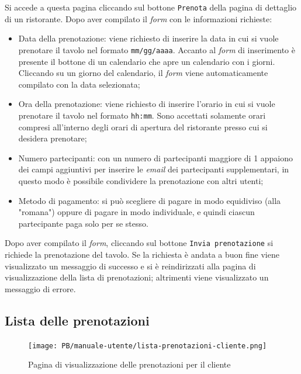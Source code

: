 Si accede a questa pagina cliccando sul bottone \texttt{Prenota} della pagina di
dettaglio di un ristorante. Dopo aver compilato il \textit{form} con le informazioni
richieste:
\begin{itemize}
	\item Data della prenotazione: viene richiesto di inserire la data in cui si
		vuole prenotare il tavolo nel formato \texttt{mm/gg/aaaa}. Accanto al
		\textit{form} di inserimento è presente il bottone di un calendario che apre un
		calendario con i giorni. Cliccando su un giorno del calendario, il \textit{form}
		viene automaticamente compilato con la data selezionata;

	\item Ora della prenotazione: viene richiesto di inserire l'orario in cui si
		vuole prenotare il tavolo nel formato \texttt{hh:mm}. Sono accettati
		solamente orari compresi all'interno degli orari di apertura del
		ristorante presso cui si desidera prenotare;

	\item Numero partecipanti: con un numero di partecipanti maggiore di 1
		appaiono dei campi aggiuntivi per inserire le \textit{email} dei partecipanti
		supplementari, in questo modo è possibile condividere la prenotazione
		con altri utenti;

	\item Metodo di pagamento: si può scegliere di pagare in modo equidiviso
		(alla "romana") oppure di pagare in modo individuale, e quindi ciascun
		partecipante paga solo per se stesso.
\end{itemize}

Dopo aver compilato il \textit{form}, cliccando sul bottone \texttt{Invia prenotazione} 
si richiede la prenotazione del tavolo. Se la richiesta è andata a buon fine
viene visualizzato un messaggio di successo e si è reindirizzati alla pagina di
visualizzazione della lista di prenotazioni; altrimenti viene visualizzato un
messaggio di errore.

\newpage
\subsection{Lista delle prenotazioni}
\begin{figure}[htbp]
    \centering
	\texttt{[image: PB/manuale-utente/lista-prenotazioni-cliente.png]}
    \caption{Pagina di visualizzazione delle prenotazioni per il cliente}
\end{figure}

